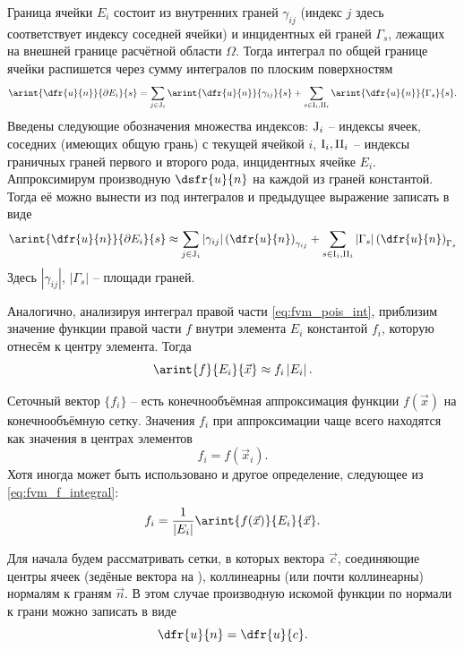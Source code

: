 Граница ячейки $E_i$ состоит из внутренних граней $\gamma_{ij}$ (индекс $j$ здесь
соответствует индексу соседней ячейки)
и инцидентных ей граней $\Gamma_{s}$, лежащих на внешней границе расчётной области $\Omega$.
Тогда интеграл по общей границе ячейки распишется через сумму интегралов по плоским поверхностям
$$
\arint{\dfr{u}{n}}{\partial E_i}{s} = \sum_{j\in{{\rm J}_i}}\arint{\dfr{u}{n}}{\gamma_{ij}}{s} + \sum_{s\in{\rm I}_i, {\rm II}_i}\arint{\dfr{u}{n}}{\Gamma_{s}}{s}.
$$
Введены следующие обозначения множества индексов: ${\rm J}_i$ -- индексы ячеек, соседних (имеющих общую грань) с текущей ячейкой $i$,
${\rm I}_i, {\rm II}_i$ -- индексы граничных граней первого и второго рода, инцидентных ячейке $E_i$.
Аппроксимирум производную $\dsfr{u}{n}$ на каждой из граней константой.
Тогда её можно вынести из под интегралов и предыдущее выражение записать в виде
\begin{equation}
\label{eq:fvm_gamma_integral}
\arint{\dfr{u}{n}}{\partial E_i}{s} \approx
\sum_{j\in{{\rm J}_i}}
    \left|
        \gamma_{ij}
    \right|
    \left(
        \dfr{u}{n}
    \right)_{\gamma_{ij}}
+\sum_{s\in{{\rm I}_i, {\rm II}_i}}
    \left|
        \Gamma_{s}
    \right|
    \left(
        \dfr{u}{n}
    \right)_{\Gamma_{s}}
\end{equation}
Здесь $|\gamma_{ij}|$, $|\Gamma_s|$ -- площади граней.

Аналогично, анализируя интеграл правой части \cref{eq:fvm_pois_int},
приблизим значение функции правой части $f$ внутри элемента $E_i$ константой $f_i$,
которую отнесём к центру элемента. Тогда
\begin{equation}
\label{eq:fvm_f_integral}
\arint{f}{E_i}{\vec x} \approx f_i \left|E_i\right|.
\end{equation}

Сеточный вектор $\{f_i\}$ -- есть конечнообъёмная аппроксимация
функции $f(\vec x)$ на конечнообъёмную сетку.
Значения $f_i$ при аппроксимации чаще всего находятся как значения в центрах элементов
$$
f_i = f(\vec x_i).
$$
Хотя иногда может быть использовано и другое определение,
следующее из \eqref{eq:fvm_f_integral}:
$$
f_i = \frac{1}{\left| E_i \right|} \arint{f(\vec x)}{E_i}{\vec x}.
$$


Для начала будем рассматривать сетки, в
которых вектора $\vec c$, соединяющие центры ячеек (зедёные вектора на ),
коллинеарны (или почти коллинеарны) нормалям к граням $\vec n$.
В этом случае производную искомой функции по нормали к грани можно записать в виде
$$
\dfr{u}{n} = \dfr{u}{c}.
$$

